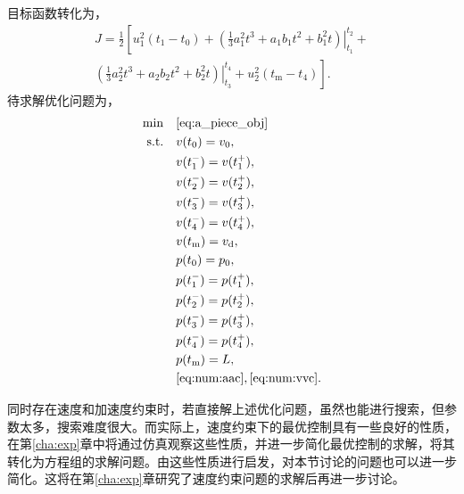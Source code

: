 目标函数转化为，
\begin{equation}
\begin{split}
J=\frac12\left[u_1^2(t_1-t_0)+\left.\left(\frac13a_1^2t^3+a_1b_1t^2+b_1^2t\right)\right|_{t_1}^{t_2}+\right.\\
\left.\left.\left(\frac13a_2^2t^3+a_2b_2t^2+b_2^2t\right)\right|_{t_3}^{t_4}+u_2^2(t_\mathrm{m}-t_4)\right].
\end{split}
\label{eq:a_piece_obj}
\end{equation}
待求解优化问题为，
\begin{align}
\min \quad& \eqref{eq:a_piece_obj}\quad\label{eq:num:aopt1}\\
\text{s.t.}
\quad& v(t_0)=v_0, \quad\\
\quad& v(t_1^-)=v(t_1^+), \quad\\
\quad& v(t_2^-)=v(t_2^+), \quad\\
\quad& v(t_3^-)=v(t_3^+), \quad\\
\quad& v(t_4^-)=v(t_4^+), \quad\\
\quad& v(t_\mathrm{m})=v_\mathrm{d}, \quad\\
\quad& p(t_0)=p_0, \quad\\
\quad& p(t_1^-)=p(t_1^+), \quad\\
\quad& p(t_2^-)=p(t_2^+), \quad\\
\quad& p(t_3^-)=p(t_3^+), \quad\\
\quad& p(t_4^-)=p(t_4^+), \quad\\
\quad& p(t_\mathrm{m})=L, \quad\\
\quad& \eqref{eq:num:aac},\eqref{eq:num:vvc}.\label{eq:num:aoptL}
\end{align}

同时存在速度和加速度约束时，若直接解上述优化问题，虽然也能进行搜索，但参数太多，搜索难度很大。而实际上，速度约束下的最优控制具有一些良好的性质，在第\ref{cha:exp}章中将通过仿真观察这些性质，并进一步简化最优控制的求解，将其转化为方程组的求解问题。由这些性质进行启发，对本节讨论的问题也可以进一步简化。这将在第\ref{cha:exp}章研究了速度约束问题的求解后再进一步讨论。


